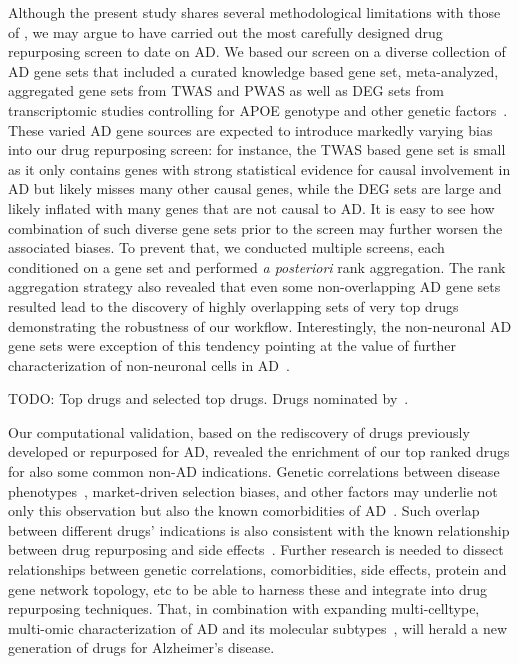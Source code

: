 \documentclass[letterpaper]{article}
\begin{document}
Although the present study shares several methodological limitations with
those of \cite{Fang2021,Taubes2021}, we may argue to have carried out the most
carefully designed drug repurposing screen to date on AD.  We based our screen
on a diverse collection of AD gene sets that included a curated knowledge
based gene set, meta-analyzed, aggregated gene sets from TWAS and PWAS as well
as DEG sets from transcriptomic studies controlling for APOE genotype and
other genetic factors~\citep{Lin2018}.  These varied AD gene sources are
expected to introduce markedly varying bias into our drug repurposing screen: for
instance, the TWAS based gene set is small as it only contains genes with
strong statistical evidence for causal involvement in AD but likely misses
many other causal genes, while the DEG sets are large and likely inflated with
many genes that are not causal to AD.  It is easy to see how combination of
such diverse gene sets prior to the screen may further worsen the associated
biases. To prevent that, we conducted multiple screens, each conditioned on a
gene set and performed \emph{a posteriori} rank aggregation.  The rank
aggregation strategy also revealed that even some non-overlapping AD gene sets
resulted lead to the discovery of highly overlapping sets of very top drugs
demonstrating the robustness of our workflow.  Interestingly, the non-neuronal
AD gene sets were exception of this tendency pointing at the value of further
characterization of non-neuronal cells in
AD~\citep{Lopes2022,Mathys2019,DeStrooper2016}.

TODO: Top drugs and selected top drugs.  Drugs nominated
by~\cite{Fang2021,Taubes2021}.

Our computational validation, based on the rediscovery of drugs previously
developed or repurposed for AD, revealed the enrichment of our top ranked
drugs for also some common non-AD indications.  Genetic correlations between
disease phenotypes~\citep{Consortium2018}, market-driven selection biases, and
other factors may underlie not only this observation but also the known
comorbidities of AD~\citep{Santiago2021}.  Such overlap between different
drugs' indications is also consistent with the known relationship between drug
repurposing and side effects~\citep{Ye2014}.  Further research is needed to
dissect relationships between genetic correlations, comorbidities, side
effects, protein and gene network topology, etc to be able to harness these and
integrate into drug repurposing techniques.  That, in combination with
expanding multi-celltype, multi-omic characterization of AD and its molecular
subtypes~\citep{Neff2021}, will herald a new generation of drugs for
Alzheimer's disease.
\end{document}
